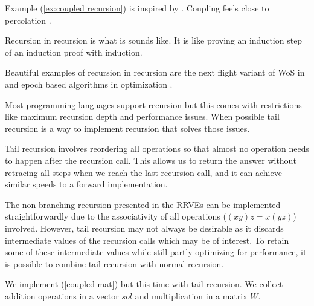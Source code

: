\documentclass[a4paper,12pt]{article}
\begin{document}
\begin{related}
    Example (\ref{ex:coupled recursion}) is inspired by \cite{vicini_path_2021}.
    Coupling feels close to percolation \cite{duminil-copin_sixty_2019}.
\end{related}

\begin{technique}
    Recursion in recursion is what is sounds like. It is like proving an induction
    step of an induction proof with induction.
\end{technique}


\begin{related}
    Beautiful examples of recursion in recursion are
    the next flight variant of WoS in
    \cite{sawhney_grid-free_2022} and epoch based algorithms in optimization
    \cite{gupta_convergence_2021}.
\end{related}

Most programming languages support recursion but this comes with restrictions
like maximum recursion depth and performance issues. When possible tail recursion is
a way to implement recursion that solves those
issues.

\begin{technique}
    Tail recursion involves reordering all operations
    so that almost no operation needs to happen after
    the recursion call. This allows us to return the
    answer without retracing all steps when we reach
    the last recursion call, and it can achieve similar
    speeds to a forward implementation.
\end{technique}

The non-branching recursion presented in the RRVEs
can be implemented straightforwardly due to the associativity of
all operations ($(xy)z = x(yz)$) involved. However, tail recursion
may not always be desirable as it discards intermediate values of
the recursion calls which may be of interest. To retain some of these intermediate
values while still partly optimizing for performance, it is possible
to combine tail recursion with normal recursion.

\begin{pythonn}
    We implement (\ref{coupled mat}) but this time with tail recursion.
    We collect addition operations in a vector $sol$ and multiplication
    in a matrix $W$.
    \vspace{0.3cm}
\end{pythonn}
\end{document}
